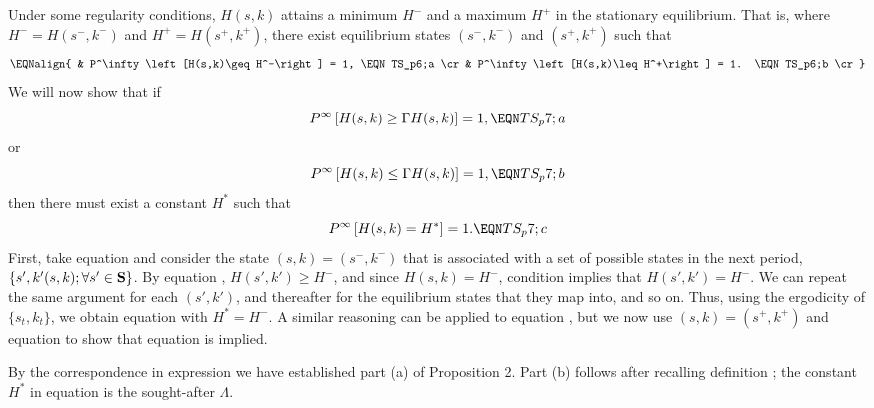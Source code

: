 Under some regularity conditions, $H(s,k)$ attains a minimum $H^-$ and a
maximum $H^+$ in the stationary equilibrium. That is, where
$H^-=H(s^-,k^-)$ and
$H^+=H(s^+,k^+)$, there exist
equilibrium states $(s^-,k^-)$ and  $(s^+,k^+)$
such that
$$\EQNalign{
& P^\infty\left[H(s,k)\geq H^-\right] = 1,       \EQN TS_p6;a \cr
& P^\infty\left[H(s,k)\leq H^+\right] = 1.       \EQN TS_p6;b \cr}
$$
We will now show that if
$$P^\infty\left[H(s,k)\geq \Gamma H(s,k) \right] = 1,       \EQN TS_p7;a
$$
or
$$P^\infty\left[H(s,k)\leq \Gamma H(s,k) \right] = 1,       \EQN TS_p7;b
$$
then there must exist a constant $H^*$ such that
$$P^\infty\left[H(s,k) = H^* \right] = 1.                   \EQN TS_p7;c
$$
First, take equation  and consider the state
$(s,k)=(s^-,k^-)$ that is associated with a set of
possible states in the next period, $\{s',k'(s,k); \forall s'\in {\bf S}\}$.
By equation , $H(s',k')\geq H^-$, and since $H(s,k)=H^-$,
condition  implies that $H(s',k')=H^-$.
We can repeat the same argument for each
$(s',k')$, and thereafter for the equilibrium states that they
map into, and so on.
Thus, using the ergodicity of $\{s_t, k_t\}$, we obtain equation 
with $H^*=H^-$.
A similar reasoning can be applied to equation , but we now
use $(s,k)=(s^+,k^+)$ and equation  to show that equation 
is implied.

By the correspondence in expression  we have established part (a) of
Proposition 2. Part (b) follows after recalling
definition ; the constant $H^*$ in equation
  is the
sought-after $\Lambda$.
 
